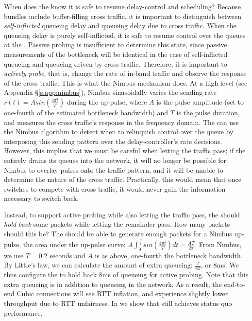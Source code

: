 When does the \inbox know it is safe to resume delay-control and scheduling?
Because bundles include buffer-filling cross traffic, it is important to distinguish between \emph{self-inflicted} queueing delay and queueing delay due to cross traffic.
When the queueing delay is purely self-inflicted, it is safe to resume control over the queues at the \inbox.
Passive probing is insufficient to determine this state, since passive measurements of the bottleneck will be identical in the case of self-inflicted queueing and queueing driven by cross traffic.
Therefore, it is important to \emph{actively probe}, that is, change the rate of in-band traffic and observe the response of the cross traffic. 
This is what the Nimbus mechanism does.
At a high level (see Appendix \S\ref{s:app:nimbus}),
Nimbus sinusoidally varies the sending rate $r(t) = A sin(\frac{4\pi{}t}{T})$ during the up-pulse, where $A$ is the pulse amplitude (set to one-fourth of the estimated bottleneck bandwidth) and $T$ is the pulse duration, and measures the cross traffic's response in the frequency domain.
The \inbox can use the Nimbus algorithm to detect when to relinquish control over the queue by interposing this sending pattern over the delay-controller's rate decisions.
However, this implies that we must be careful when letting the traffic pass; if the \inbox entirely drains its queues into the network, it will no longer be possible for Nimbus to overlay pulses onto the traffic pattern, and it will be unable to determine the nature of the cross traffic.
Practically, this would mean that once \inbox switches to compete with cross traffic, it would never gain the information necessary to switch back.

Instead, to support active probing while also letting the traffic pass, the \inbox should \emph{hold back} some packets while letting the remainder pass.
How many packets should this be? The \inbox should be able to generate enough packets for a Nimbus up-pulse, \ie the area under the up-pulse curve: 
$A \int_0^{\frac{T}{4}} sin(\frac{4\pi{}t}{T}) dt = \frac{AT}{2\pi}$.
From Nimbus, we use $T = 0.2$ seconds and $A$ is as above, one-fourth the bottleneck bandwidth. By Little's law, we can calculate the amount of extra queueing: $\frac{T}{8\pi}$, or $8$ms.
We thus configure the \inbox to hold back $8$ms of queueing for active probing.
Note that this extra queueing is in addition to queueing in the network. As a result, the end-to-end Cubic connections will see RTT inflation, and experience slightly lower throughput due to RTT unfairness. In  we show that \name still achieves status quo performance.

